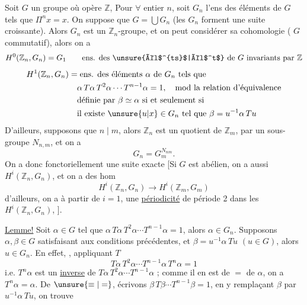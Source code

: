 Soit $G$ un groupe où opère $\mathbb Z$,  Pour $\forall$ entier $n$, soit $G_n$ l'ens des éléments de $G$ tels que $\Pi^n x=x$.
On suppose que $G=\bigcup G_n$ (les $G_n$ forment une suite croissante). Alors $G_n$ est un $\mathbb Z_n$-groupe, et on peut considérer sa cohomologie  ( $G$ commutatif), alors on a
\[
H^0(\mathbb Z_n,G_n)=G_1\qquad\text{ens. des \unsure{él$^{ts}$|él$^t$} de $G$ invariants par $\mathbb Z$}
\]
\[
\begin{aligned}
H^1(\mathbb Z_n,G_n)&=\text{ens. des éléments $\alpha$ de $G_n$ tels que}\\
&\quad\alpha\,T\alpha\,T^2\alpha\cdots T^{n-1}\alpha=1,\quad\text{mod la relation d'équivalence}\\
&\quad\text{définie par }\beta\simeq\alpha\text{ si et seulement si}\\
&\quad\text{il existe }\unsure{u|x}\in G_n\text{ tel que }\beta=u^{-1}\alpha\,Tu
\end{aligned}
\]
D'ailleurs, supposons que $n\mid m$, alors $\mathbb Z_n$ est un quotient de $\mathbb Z_m$,  par un sous-groupe $N_{n,m}$, et on a
\[
\boxed{G_n=G_m^{N_{nm}}}.
\]
On a donc fonctoriellement une suite exacte
[Si  $G$ est abélien, on a aussi $H^i(\mathbb Z_n,G_n)$, et on a des hom
\[
H^i(\mathbb Z_n,G_n)\longrightarrow H^i(\mathbb Z_m,G_m)
\]
d'ailleurs, on a à partir de $i=1$, une \uline{périodicité} de période 2 dans les $H^i(\mathbb Z_n,G_n)$,  ].

\uline{Lemme!} Soit $\alpha\in G$ tel que $\alpha\,T\alpha\,T^2\alpha\cdots T^{n-1}\alpha=1$, alors $\alpha\in G_n$.
Supposons $\alpha,\beta\in G$ satisfaisant aux conditions précédentes, et $\beta=u^{-1}\alpha\,Tu$ $(u\in G)$, alors $u\in G_n$.
En effet, , appliquant $T$ \deleted{$\unsure{\cdot}$}
\[
T\alpha\,T^2\alpha\cdots T^{n-1}\alpha\,T^n\alpha=1
\]
i.e. $T^n\alpha$ est un \uline{inverse}  de $T\alpha\,T^2\alpha\cdots T^{n-1}\alpha$ ; comme il en est de $=$ de $\alpha$, on a $T^n\alpha=\alpha$.
De $\unsure{\equiv|=}$, écrivons $\beta\,T\beta\cdots T^{n-1}\beta=1$, en y remplaçant $\beta$ par $u^{-1}\alpha\,Tu$, on trouve
